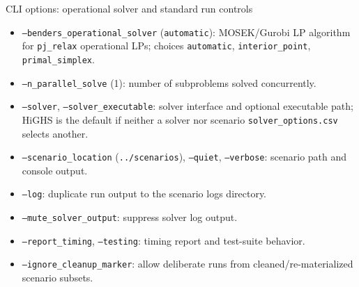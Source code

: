 \documentclass[aspectratio=169,10pt]{beamer}
\begin{document}
\begin{frame}{CLI options: operational solver and standard run controls}
\scriptsize
\begin{itemize}
\item \texttt{--benders\_operational\_solver} (\texttt{automatic}): MOSEK/Gurobi LP algorithm for \texttt{pj\_relax} operational LPs; choices \texttt{automatic}, \texttt{interior\_point}, \texttt{primal\_simplex}.
\item \texttt{--n\_parallel\_solve} (1): number of subproblems solved concurrently.
\item \texttt{--solver}, \texttt{--solver\_executable}: solver interface and optional executable path; HiGHS is the default if neither a solver nor scenario \texttt{solver\_options.csv} selects another.
\item \texttt{--scenario\_location} (\texttt{../scenarios}), \texttt{--quiet}, \texttt{--verbose}: scenario path and console output.
\item \texttt{--log}: duplicate run output to the scenario logs directory.
\item \texttt{--mute\_solver\_output}: suppress solver log output.
\item \texttt{--report\_timing}, \texttt{--testing}: timing report and test-suite behavior.
\item \texttt{--ignore\_cleanup\_marker}: allow deliberate runs from cleaned/re-materialized scenario subsets.
\end{itemize}
\end{frame}
\end{document}
